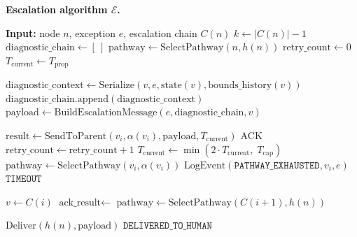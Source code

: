 \bigskip
\noindent\textbf{Escalation algorithm $\mathcal{E}$.}

\begin{algorithm}[H]
\caption{Bailout Protocol escalation algorithm $\mathcal{E}(n, e, C)$. Executed by the Bailout Monitor in the \fact{} layer of each node in the escalation chain. All communication uses authenticated channels verified against the authorization ledger.}
\label{alg:escalation}
\begin{algorithmic}[1]
\State \textbf{Input:} node $n$, exception $e$, escalation chain $C(n)$
\State $k \leftarrow |C(n)| - 1$ 
\State $\text{diagnostic\_chain} \leftarrow [\:]$
\State $\text{pathway} \leftarrow \text{SelectPathway}(n, h(n))$
\State $\text{retry\_count} \leftarrow 0$
\State $T_{\text{current}} \leftarrow T_{\text{prop}}$ 

  \State $\text{diagnostic\_context} \leftarrow \text{Serialize}(v, e, \text{state}(v), \text{bounds\_history}(v))$
  \State $\text{diagnostic\_chain.append}(\text{diagnostic\_context})$
  \State $\text{payload} \leftarrow \text{BuildEscalationMessage}(e, \text{diagnostic\_chain}, v)$
\EndProcedure

    \State $\text{result} \leftarrow \text{SendToParent}(v_i, \alpha(v_i), \text{payload}, T_{\text{current}})$
      \State \Return $\text{ACK}$ 
     
      \State $\text{retry\_count} \leftarrow \text{retry\_count} + 1$
      \State $T_{\text{current}} \leftarrow \min(2 \cdot T_{\text{current}},\; T_{\text{cap}})$ 
      \State $\text{pathway} \leftarrow \text{SelectPathway}(v_i, \alpha(v_i))$ 
      \State {}
    \EndIf
  \EndWhile
  \State {}
  \State $\text{LogEvent}(\texttt{PATHWAY\_EXHAUSTED}, v_i, e)$
  \State \Return $\texttt{TIMEOUT}$ 
\EndProcedure

\Statex
\State {}
  \State $v \leftarrow C(i)$ 
  \State {}
  \State $\text{ack\_result} \leftarrow $ 
    \State $\text{pathway} \leftarrow \text{SelectPathway}(C(i+1), h(n))$ 
    \State {} 
  \EndIf
\EndFor

\Statex
\State {}
\State $\text{Deliver}(h(n), \text{payload})$
\State \Return $\texttt{DELIVERED\_TO\_HUMAN}$
\end{algorithmic}
\end{algorithm}

